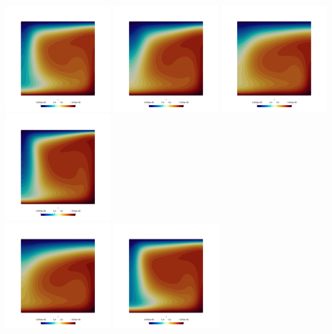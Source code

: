 \begin{center}
\includegraphics[width=4cm]{python_codes/fieldstone_28/results_case5/T_0040}
\includegraphics[width=4cm]{python_codes/fieldstone_28/results_case5/T_0050}
\includegraphics[width=4cm]{python_codes/fieldstone_28/results_case5/T_0060}
\includegraphics[width=4cm]{python_codes/fieldstone_28/results_case5/T_0070}\\
\includegraphics[width=4cm]{python_codes/fieldstone_28/results_case5/T_0080}
\includegraphics[width=4cm]{python_codes/fieldstone_28/results_case5/T_0090}

\end{center}
